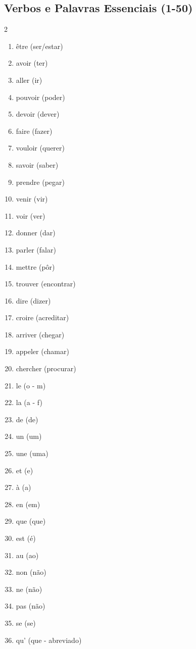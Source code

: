 \documentclass[a4paper,12pt]{article}
\begin{document}
\subsection{Verbos e Palavras Essenciais (1-50)}
\begin{multicols}{2}
\begin{enumerate}[label=\arabic*., start=1]
    \item être (ser/estar)
    \item avoir (ter)
    \item aller (ir)
    \item pouvoir (poder)
    \item devoir (dever)
    \item faire (fazer)
    \item vouloir (querer)
    \item savoir (saber)
    \item prendre (pegar)
    \item venir (vir)
    \item voir (ver)
    \item donner (dar)
    \item parler (falar)
    \item mettre (pôr)
    \item trouver (encontrar)
    \item dire (dizer)
    \item croire (acreditar)
    \item arriver (chegar)
    \item appeler (chamar)
    \item chercher (procurar)
    \item le (o - m)
    \item la (a - f)
    \item de (de)
    \item un (um)
    \item une (uma)
    \item et (e)
    \item à (a)
    \item en (em)
    \item que (que)
    \item est (é)
    \item au (ao)
    \item non (não)
    \item ne (não)
    \item pas (não)
    \item se (se)
    \item qu’ (que - abreviado)

\end{enumerate}
\end{multicols}
\end{document}
